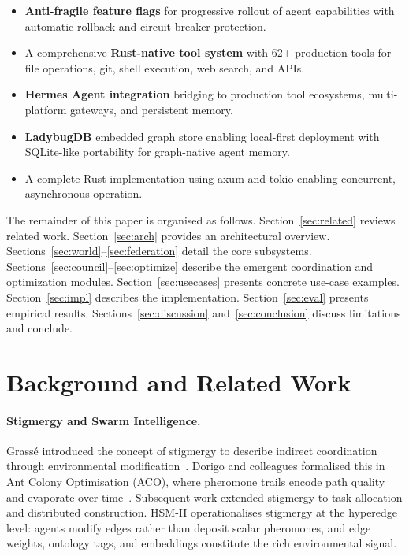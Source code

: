 \documentclass[11pt]{article}
\begin{document}
\begin{itemize}[noitemsep,topsep=4pt]
  \item \textbf{Anti-fragile feature flags} for progressive rollout of agent
        capabilities with automatic rollback and circuit breaker protection.
  \item A comprehensive \textbf{Rust-native tool system} with 62+ production
        tools for file operations, git, shell execution, web search, and APIs.
  \item \textbf{Hermes Agent integration} bridging to production tool ecosystems,
        multi-platform gateways, and persistent memory.
  \item \textbf{LadybugDB} embedded graph store enabling local-first deployment
        with SQLite-like portability for graph-native agent memory.
  \item A complete Rust implementation using axum and tokio enabling concurrent,
        asynchronous operation.
\end{itemize}

The remainder of this paper is organised as follows.
Section~\ref{sec:related} reviews related work.
Section~\ref{sec:arch} provides an architectural overview.
Sections~\ref{sec:world}--\ref{sec:federation} detail the core subsystems.
Sections~\ref{sec:council}--\ref{sec:optimize} describe the emergent coordination
and optimization modules.
Section~\ref{sec:usecases} presents concrete use-case examples.
Section~\ref{sec:impl} describes the implementation.
Section~\ref{sec:eval} presents empirical results.
Sections~\ref{sec:discussion} and~\ref{sec:conclusion} discuss limitations and
conclude.

\section{Background and Related Work}
\nopagebreak[4]
\label{sec:related}

\paragraph{Stigmergy and Swarm Intelligence.}
Grass\'e introduced the concept of stigmergy to describe indirect coordination
through environmental modification~\cite{grasse1959}. Dorigo and colleagues
formalised this in Ant Colony Optimisation (ACO), where pheromone trails encode
path quality and evaporate over time~\cite{dorigo1996}. Subsequent work extended
stigmergy to task allocation and distributed construction. HSM-II operationalises
stigmergy at the hyperedge level: agents modify edges rather than deposit scalar
pheromones, and edge weights, ontology tags, and embeddings constitute the rich
environmental signal.
\end{document}

